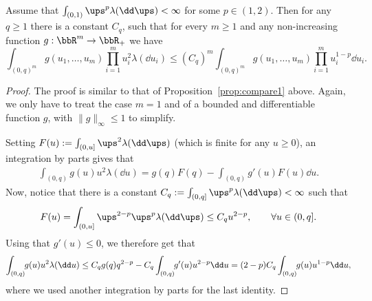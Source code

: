 \begin{proposition}
\label{prop:compare2}
Assume that $\int_{(0,1)} \ups^p \lambda(\dd \ups) <\infty$
for some $p \in (1,2)$. Then for any $q\geq 1$ there is
a constant $C_q$,
such that for every $m\geq 1$ and any non-increasing function $g:\bbR^m \to \bbR_+$ we have
\[
\int_{(0,q)^m} g(u_1, \ldots, u_m) \prod_{i=1}^m u_i^2 \lambda(\dd u_i) \leq (C_q)^m \int_{(0,q)^m} g(u_1, \ldots, u_m) \prod_{i=1}^m u_i^{1-p} \dd u_i.
\]
\end{proposition}

\begin{proof}
The proof is similar to that of Proposition~\ref{prop:compare1}
above.
Again, we only have to treat the case $m=1$ and of a bounded and differentiable function $g$, with $\|g\|_{\infty} \leq 1$ to simplify.

Setting $F(u):= \int_{(0,u]} \ups^2 \lambda(\dd \ups)$ (which is finite for any $u\geq 0$),
an integration by parts gives that
\begin{align*}
\int_{(0,q)} g(u) u^2 \lambda(\dd u) = g(q) F(q) - \int_{(0,q)} g'(u) F(u) \dd u.
\end{align*}
Now, notice that there is a constant $C_q := \int_{(0,q]} \ups^{p} \lambda(\dd\ups)<\infty$ such that
\begin{equation}
F(u)= \int_{(0,u]} \ups^{2-p} \ups^p \lambda(\dd \ups) \leq C_q u^{2-p}, \qquad \forall u\in (0,q].
\end{equation}
Using that $g'(u)\leq 0$, we therefore get that
\[
\int_{(0,q)}\hspace*{-1mm} g(u) u^2 \lambda(\dd u) \leq C_q g(q) q^{2-p} - C_q \int_{(0,q)}\hspace*{-1mm} g'(u) u^{2-p} \dd u
= (2-p) C_q \int_{(0,q)}\hspace*{-1mm} g(u) u^{1-p} \dd u,
\]
where we used another integration by parts
for the last identity.
\end{proof}

